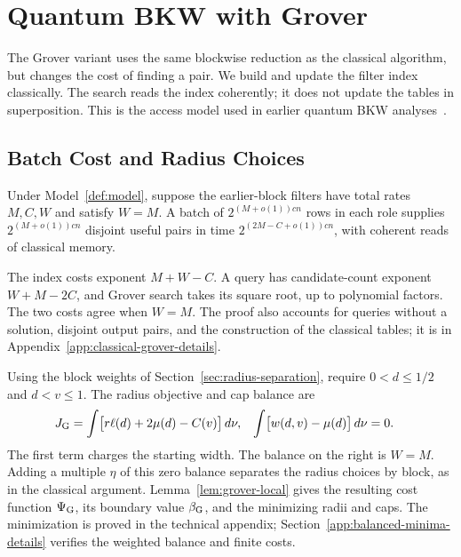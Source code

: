 \documentclass[runningheads,envcountsame,envcountsect,orivec]{llncs}
\begin{document}
\section{Quantum BKW with Grover}
\label{sec:quantum-grover}

The Grover variant uses the same blockwise reduction as the classical
algorithm, but changes the cost of finding a pair. We build and update
the filter index classically. The search reads the index coherently;
it does not update the tables in superposition. This is the access model used in earlier quantum BKW
analyses~\cite{GJMS19,M19}.

\subsection{Batch Cost and Radius Choices}
\label{sec:grover-bkw}


\begin{lemma}
\label{lem:grover-batch}
Under Model~\ref{def:model}, suppose the earlier-block filters
have total rates $M,C,W$ and satisfy $W=M$.
A batch of $2^{(M+o(1))cn}$ rows in each role supplies
$2^{(M+o(1))cn}$ disjoint useful pairs in time
$2^{(2M-C+o(1))cn}$, with coherent reads of classical memory.
\end{lemma}


The index costs exponent $M+W-C$. A query has candidate-count exponent
$W+M-2C$, and Grover search takes its square root, up to polynomial
factors. The two costs agree when $W=M$. The proof also accounts for
queries without a solution, disjoint output pairs, and the construction
of the classical tables; it is in Appendix~\ref{app:classical-grover-details}.

Using the block weights of Section~\ref{sec:radius-separation}, require
$0<d\le1/2$ and $d<v\le1$. The radius objective and cap balance are
\begin{align}
 J_{\rm G}
   &=\int\bigl[r\ell(d)+2\mu(d)-C(v)\bigr]\,d\nu,
 &\int\bigl[w(d,v)-\mu(d)\bigr]\,d\nu&=0.
 \label{eq:separation-g}
\end{align}
The first term charges the starting width. The balance on the right
is $W=M$. Adding a multiple $\eta$ of this zero balance separates
the radius choices by block, as in the classical argument.
Lemma~\ref{lem:grover-local} gives the resulting cost function
$\Psi_{\rm G}$, its boundary value $\beta_{\rm G}$, and the minimizing
radii and caps. The minimization is proved in the technical
appendix; Section~\ref{app:balanced-minima-details} verifies the
weighted balance and finite costs.
\end{document}
